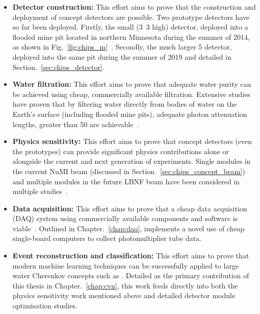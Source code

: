 \begin{itemize}
    \item \textbf{Detector construction:} This effort aims to prove that the construction and
          deployment of \chips concept detectors are possible. Two prototype detectors have so far
          been deployed. Firstly, the small (\unit{3.3}{} high) \chipsm detector,
          deployed into a flooded mine pit located in northern Minnesota during the summer of
          2014, as shown in Fig.~\ref{fig:chips_m}~\cite{perch2015, pfutznerProto2017,
              pfutzner2017}. Secondly, the much larger \unit{5}{} \chipsfive detector,
          deployed into the same pit during the summer of 2019 and detailed in
          Section.~\ref{sec:chips_detector}.

    \item \textbf{Water filtration:} This effort aims to prove that adequate water purity can be
          achieved using cheap, commercially available filtration. Extensive studies have proven
          that by filtering water directly from bodies of water on the Earth's surface (including
          flooded mine pits), adequate photon attenuation lengths, greater than
          \unit{50}{} are achievable~\cite{amat2017, campbell2020}.

    \item \textbf{Physics sensitivity:} This effort aims to prove that \chips concept detectors
          (even the prototypes) can provide significant physics contributions alone or alongside
          the current and next generation of experiments. Single modules in the current NuMI beam
          (discussed in Section.~\ref{sec:chips_concept_beam}) and multiple modules in the future
          LBNF beam have been considered in multiple studies~\cite{pfutzner2017, adde2016,
              lang2015}.

    \item \textbf{Data acquisition:} This effort aims to prove that a cheap data acquisition (DAQ)
          system using commercially available components and software is viable~\cite{eijk2018}.
          Outlined in Chapter.~\ref{chap:daq}, \chips implements a novel use of cheap single-board
          computers to collect photomultiplier tube data.

    \item \textbf{Event reconstruction and classification:} This effort aims to prove that modern
          machine learning techniques can be successfully applied to large water Cherenkov
          concepts such as \chips. Detailed as the primary contribution of this thesis in
          Chapter.~\ref{chap:cvn}, this work feeds directly into both the physics sensitivity work
          mentioned above and detailed detector module optimisation studies.
\end{itemize}

